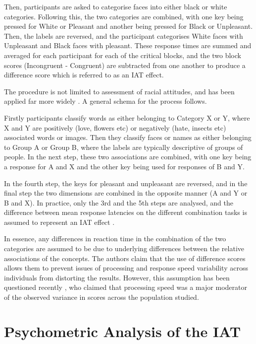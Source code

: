 Then, participants are asked to categorise faces into either black or white categories. Following this, the two categories are combined, with one key being pressed for White or Pleasant and another being pressed for Black or Unpleasant. Then, the labels are reversed, and the participant categorises White faces with Unpleasant and Black faces with pleasant. These response times are summed and averaged for each participant for each of the critical blocks, and the two block scores (Incongruent - Congruent) are subtracted from one another to produce a difference score which is referred to as an IAT effect. 

The procedure is not limited to assessment of racial attitudes, and has been applied far more widely \cite{Craeynest2008,Greenwald2009, Schmukle2008,Walker2008}.  A general schema for the process follows.   

Firstly participants classify words as either belonging to Category X or Y, where X and Y are positively (love, flowers etc) or negatively (hate, insects etc) associated words or images.  Then they classify faces or names as either belonging to Group A or Group B, where the labels are typically descriptive of groups of people.  In the next step, these two associations are combined, with one key being a response for A and X and the other key being used for responses of B and Y. 

In the fourth step, the keys for pleasant and unpleasant are reversed, and in the final step the two dimensions are combined in the opposite manner (A and Y or B and X). In practice, only the 3rd and the 5th steps are analysed, and the difference between mean response latencies on the different combination tasks is assumed to represent an IAT effect \cite{Greenwald1998} . 

In essence, any differences in reaction time in the combination of the two categories are assumed to be due to underlying differences between the relative associations of the concepts. The authors claim that the use of difference scores allows them to prevent issues of processing and response speed variability across individuals from distorting the results. However, this assumption has been questioned recently \cite{Blanton2006}, who claimed that processing speed was a major moderator of the observed variance in scores across the population studied.  

\section{Psychometric Analysis of the IAT}
\label{sec:uses-psych-feat}

